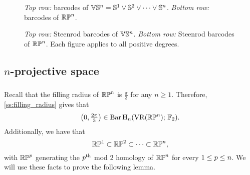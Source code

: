 \begin{figure}
	\centering
	
	\caption{\emph{Top row:} barcodes of $\mathbb{V}\mathbb{S}^n = \mathbb{S}^1 \vee \mathbb{S}^2 \vee \dots \vee \mathbb{S}^n$. \emph{Bottom row:} barcodes of $\mathbb{RP}^n$.}
	\label{fig:barcodes}
\end{figure}

\begin{figure}
	\centering
	
	\caption{\emph{Top row:} Steenrod barcodes of $\mathbb{V}\mathbb{S}^n$. \emph{Bottom row:} Steenrod barcodes of $\mathbb{RP}^n$. Each figure applies to all positive degrees.}
	\label{fig:sq barcodes}
\end{figure}

\subsection{$n$-projective space}

\subsubsection{}\label{prop:RPn bar}

Recall that the filling radius of $\mathbb{RP}^n$ is $\frac{\pi}{3}$ for any $n \geq 1$.
Therefore, \cref{ss:filling_radius} gives that
\[
\left(0, \tfrac{2\pi}{3}\right) \in \operatorname{Bar} \operatorname{H}_{n}(\operatorname{VR}(\mathbb{RP}^n);\,{\mathbb{F}_2}).
\]
Additionally, we have that
\[
\mathbb{RP}^1 \subset \mathbb{RP}^2 \subset \dots \subset \mathbb{RP}^n,
\]
with $\mathbb{RP}^p$ generating the $p^{\mathrm{th}}$ mod 2 homology of $\mathbb{RP}^n$ for every $1 \leq p \leq n$.
We will use these facts to prove the following lemma. 


